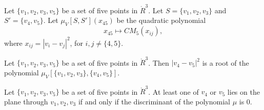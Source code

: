 \begin{tarskidata}
\begin{tarski}

\begin{definition}[$\mu_V$]
Let $\{v_1,v_2,v_3,v_5\}$ be a set of five
points in $\ring{R}^3$.   Let $S=\{v_1,v_2,v_3\}$ and $S'=\{v_4,v_5\}$.
Let $\mu_V[S,S'](x_{45})$ be the quadratic polynomial 
   $$x_{45}\mapsto CM_5(x_{ij}),$$
where $x_{ij} = |v_i-v_j|^2$, for ${i,j}\ne \{4,5\}$.  
\end{definition}
\end{tarski}



\begin{tarski}

\begin{lemma}  
Let $\{v_1,v_2,v_3,v_5\}$ be a set of five
points in $\ring{R}^3$.  
Then $|v_4-v_5|^2$ is a root of the polynomial 
$\mu_V[\{v_1,v_2,v_3\},\{v_4,v_5\}]$. 
\end{lemma}

\begin{proved}
\swallowed\end{proved}
\end{tarski}




\begin{tarski}

\begin{lemma}
Let $\{v_1,v_2,v_3,v_5\}$ be a set of five
points in $\ring{R}^3$.  
At least one of $v_4$ or $v_5$ lies on the plane through $v_1,v_2,v_3$ if and only if
the discriminant of the polynomial $\mu$ is $0$.
\end{lemma}

\begin{proved}
\swallowed\end{proved}
\end{tarski}




\end{tarskidata}
